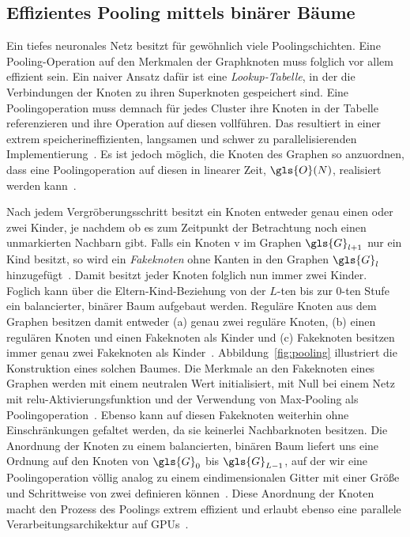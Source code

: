 \subsection{Effizientes Pooling mittels binärer Bäume}
\label{pooling_mit_baeumen}

Ein tiefes neuronales Netz besitzt für gewöhnlich viele Poolingschichten.
Eine Poo\-ling-Operation auf den Merkmalen der Graphknoten muss folglich vor allem effizient sein.
Ein naiver Ansatz dafür ist eine \emph{Lookup-Tabelle}, in der die Verbindungen der Knoten zu ihren Superknoten gespeichert sind.
Eine Poolingoperation muss demnach für jedes Cluster ihre Knoten in der Tabelle referenzieren und ihre Operation auf diesen vollführen.
Das resultiert in einer extrem speicherineffizienten, langsamen und schwer zu parallelisierenden Implementierung~\cite{Defferrard}.
Es ist jedoch möglich, die Knoten des Graphen so anzuordnen, dass eine Poolingoperation auf diesen in linearer Zeit, \dhe{} $\gls{O}\left(N\right)$, realisiert werden kann~\cite{Defferrard}.



Nach jedem Vergröberungsschritt besitzt ein Knoten entweder genau einen oder zwei Kinder, je nachdem ob es zum Zeitpunkt der Betrachtung noch einen unmarkierten Nachbarn gibt.
Falls ein Knoten \gls{v} im Graphen $\gls{G}_{l+1}$ nur ein Kind besitzt, so wird ein \emph{Fakeknoten} ohne Kanten in den Graphen $\gls{G}_l$ hinzugefügt~\cite{Defferrard}.
Damit besitzt jeder Knoten folglich nun immer zwei Kinder.
Foglich kann über die Eltern-Kind-Beziehung von der $L$-ten bis zur $0$-ten Stufe ein balancierter, binärer Baum aufgebaut werden.
Reguläre Knoten aus dem Graphen besitzen damit entweder (a) genau zwei reguläre Knoten, (b) einen regulären Knoten und einen Fakeknoten als Kinder und (c) Fakeknoten besitzen immer genau zwei Fakeknoten als Kinder~\cite{Defferrard}.
Abbildung~\ref{fig:pooling} illustriert die Konstruktion eines solchen Baumes.
Die Merkmale an den Fakeknoten eines Graphen werden mit einem neutralen Wert initialisiert, \dhe{} \zB{} mit Null bei einem Netz mit \gls{relu}-Aktivierungsfunktion und der Verwendung von Max-Pooling als Poolingoperation~\cite{Defferrard}.
Ebenso kann auf diesen Fakeknoten weiterhin ohne Einschränkungen gefaltet werden, da sie keinerlei Nachbarknoten besitzen.
Die Anordnung der Knoten zu einem balancierten, binären Baum liefert uns eine Ordnung auf den Knoten von $\gls{G}_0$ bis $\gls{G}_{L-1}$, auf der wir eine Poolingoperation völlig analog zu einem eindimensionalen Gitter mit einer Größe und Schrittweise von zwei definieren können~\cite{Defferrard}.
Diese Anordnung der Knoten macht den Prozess des Poolings extrem effizient und erlaubt ebenso eine parallele Verarbeitungsarchikektur auf GPUs~\cite{Defferrard}.

